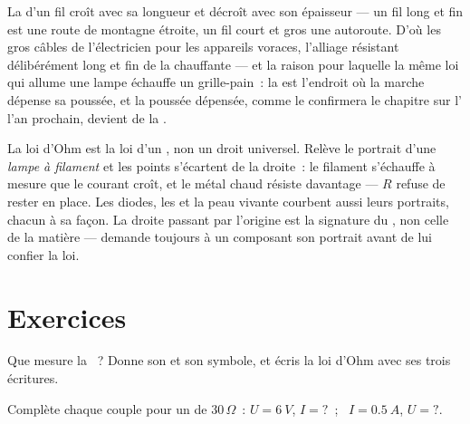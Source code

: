 \begin{example}\label{ex:g8:ohms-law:wires}
La  d'un fil croît avec sa longueur et décroît avec son
épaisseur --- un fil long et fin est une route de montagne étroite,
un fil court et gros une autoroute. D'où les gros câbles de
l'électricien pour les appareils voraces, l'alliage résistant
délibérément long et fin de la  chauffante --- et la raison
pour laquelle la même loi qui allume une lampe échauffe un
grille-pain~: la  est l'endroit où la marche dépense sa
poussée, et la poussée dépensée, comme le confirmera le chapitre sur
l' l'an prochain, devient de la .
\end{example}

\begin{remark}\label{rem:g8:ohms-law:limits}
La loi d'Ohm est la loi d'un , non un droit universel. Relève
le portrait d'une \emph{lampe à filament} et les points s'écartent de
la droite~: le filament s'échauffe à mesure que le courant croît, et
le métal chaud résiste davantage --- $R$ refuse de rester en place.
Les diodes, les  et la peau vivante courbent aussi leurs
portraits, chacun à sa façon. La droite passant par l'origine est la
signature du , non celle de la matière --- demande toujours à
un composant son portrait avant de lui confier la loi.
\end{remark}

\section{Exercices}

\begin{exercise}[$\star$]\label{exo:g8:ohms-law:1}
Que mesure la ~? Donne son  et son symbole, et écris
la loi d'Ohm avec ses trois écritures.
\end{exercise}

\begin{exercise}[$\star$]\label{exo:g8:ohms-law:2}
Complète chaque couple pour un  de $30\,\Omega$~:
$U = \qty{6}{V}$, $I = {?}$~; \ $I = \qty{0.5}{A}$, $U = {?}$.
\end{exercise}

